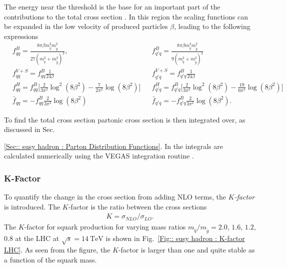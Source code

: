 \documentclass[twoside,english]{uiofysmaster}
\begin{document}
{The energy near the threshold is the base for an important part of the contributions to the total cross section \cite{Beenakker:1996ch}. In this region the scaling functions can be expanded in the low velocity of produced particles $\beta$, leading to the following expressions \cite{Beenakker:1996ch}
\begin{align}
&f_{qq}^B = \frac{8 \pi \beta m_{\widetilde{q}}^2 m_{\widetilde{g}}^2}{27(m_{\widetilde{q}}^2 + m_{\widetilde{g}}^2)^2}, &&f_{q'q}^B = \frac{8 \pi \beta m_{\widetilde{q}}^2 m_{\widetilde{g}}^2}{9(m_{\widetilde{q}}^2 + m_{\widetilde{g}}^2)^2} \nonumber \\
& f_{qq}^{V+S} = f_{qq}^B \frac{1}{24 \beta} && f_{q'q}^{V+S} = f_{q'q}^B \frac{1}{24 \beta} \nonumber \\
&f_{qq}^H = f_{qq}^B \Big[\frac{2}{3 \pi^2} \log^2(8 \beta^2) - \frac{7}{2 \pi^2} \log (8 \beta^2) \Big] &&f_{q'q}^H = f_{q'q}^B \Big[\frac{2}{3 \pi^2} \log^2(8 \beta^2) - \frac{19}{6 \pi^2} \log (8 \beta^2) \Big] \nonumber \\
& \bar{f}_{qq} = - f_{qq}^B \frac{2}{3 \pi^2} \log (8 \beta^2) &&\bar{f}_{q'q} = - f_{q'q}^B \frac{2}{3 \pi^2} \log (8 \beta^2).\label{Eq:: susy hadron : Scaling functions near threshold}
\end{align}

To find the total cross section partonic cross section is then integrated over, as discussed in Sec.~{\ref{Sec:: susy hadron : Parton Distribution Functions}. In \cite{Beenakker:1996ch} the integrals are calculated numerically using the VEGAS integration routine \cite{PETERLEPAGE1978192}.


\subsubsection{K-Factor}

To quantify the change in the cross section from adding NLO terms, the \textit{$K$-factor} is introduced. The $K$-factor is the ratio between the cross sections
\begin{align}
K = \sigma_{NLO}/\sigma_{LO}.
\end{align}
The $K$-factor for squark production for varying mass ratios $m_{\widetilde{q}}/m_{\widetilde{g}}=2.0$, $ 1.6$, $1.2$, $0.8$ at the LHC at $\sqrt{s}=14~\mathrm{TeV}$ is shown in Fig.~\ref{Fig:: susy hadron : K-factor LHC}. As seen from the figure, the $K$-factor is larger than one and quite stable as a function of the squark mass. 

}}
\end{document}
